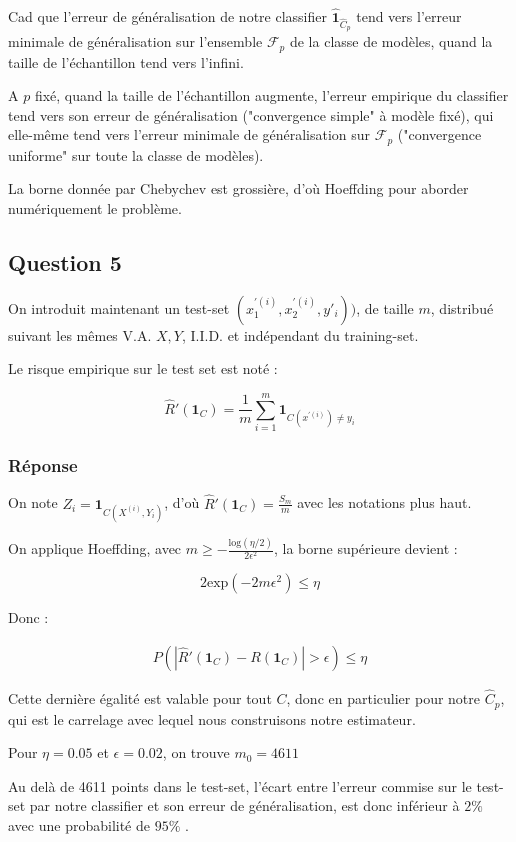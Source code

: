 \documentclass[french]{article}
\begin{document}
Cad que l'erreur de généralisation de notre classifier $\hat{\mathbf{1}}_{\hat{C}_{p}}$ tend vers l'erreur minimale de généralisation sur l'ensemble $\mathcal{F}_{p}$ de la classe de modèles, quand la taille de l'échantillon tend vers l'infini.

A $p$ fixé, quand la taille de l'échantillon augmente, l'erreur empirique du classifier tend vers son erreur de généralisation ("convergence simple" à modèle fixé), qui elle-même tend vers l'erreur minimale de généralisation sur $\mathcal{F}_{p}$ ("convergence uniforme" sur toute la classe de modèles).

La borne donnée par Chebychev est grossière, d'où Hoeffding pour aborder numériquement le problème.

\subsection{Question 5}

On introduit maintenant un test-set $(x_{1}^{'(i)}, x_{2}^{'(i)}, y'_{i}))$, de taille $m$, distribué suivant les mêmes V.A. $X, Y$, I.I.D. et indépendant du training-set.

Le risque empirique sur le test set est noté :

\[
\hat{R}'(\mathbf{1}_{C}) = \frac{1}{m}\sum_{i=1}^{m}\mathbf{1}_{{C}(x^{'(i)}) \neq y_{i}}
\]

\subsubsection{Réponse}

On note $Z_{i} = \mathbf{1}_{C(X^{(i)},Y_{i})}$, d'où $\hat{R}'(\mathbf{1}_{C}) = \frac{S_{m}}{m}$ avec les notations plus haut.

On applique Hoeffding, avec $m \geq -\frac{\mathrm{log}(\eta/2)}{2\epsilon^{2}}$, la borne supérieure devient :

\[
2\mathrm{exp}(-2m\epsilon^{2}) \leq \eta
\]

Donc :

\begin{align}
P(|\hat{R}'(\mathbf{1}_{C}) - R(\mathbf{1}_{C})| > \epsilon) \leq \eta
\end{align}

Cette dernière égalité est valable pour tout $C$, donc en particulier pour notre $\hat{C}_{p}$, qui est le carrelage avec lequel nous construisons notre estimateur.

Pour $\eta = 0.05$ et $\epsilon = 0.02$, on trouve $m_{0} = 4611$

Au delà de 4611 points dans le test-set, l'écart entre l'erreur commise sur le test-set par notre classifier et son erreur de généralisation, est donc inférieur à $2\%$ avec une probabilité de $95\%$ .
\end{document}
